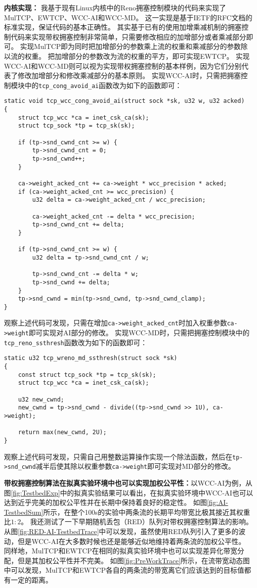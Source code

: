 \documentclass[winfonts]{njuthesis}
\begin{document}
\textbf{内核实现：}
我基于现有Linux内核中的Reno拥塞控制模块的代码来实现了MulTCP、EWTCP、WCC-AI和WCC-MD。
这一实现是基于IETF的RFC文档\cite{allman2009CC}的标准实现，保证代码的基本正确性。
其实基于已有的使用加增乘减机制的拥塞控制代码来实现带权拥塞控制非常简单，只需要修改相应的加增部分或者乘减部分即可。
实现MulTCP即为同时把加增部分的参数乘上流的权重和乘减部分的参数除以流的权重。
把加增部分的参数改为流的权重的平方，即可实现EWTCP。
实现WCC-AI和WCC-MD则可以视为实现带权拥塞控制的基本样例，因为它们分别代表了修改加增部分和修改乘减部分的基本原则。
实现WCC-AI时，只需把拥塞控制模块中的\texttt{tcp\_cong\_avoid\_ai}函数改为如下的函数即可：
\lstset{language=C,basicstyle=\footnotesize,frame=shadowbox}
\begin{lstlisting}
static void tcp_wcc_cong_avoid_ai(struct sock *sk, u32 w, u32 acked)
{
	struct tcp_wcc *ca = inet_csk_ca(sk);
	struct tcp_sock *tp = tcp_sk(sk);

	if (tp->snd_cwnd_cnt >= w) {
		tp->snd_cwnd_cnt = 0;
		tp->snd_cwnd++;
	}

	ca->weight_acked_cnt += ca->weight * wcc_precision * acked;
	if (ca->weight_acked_cnt >= wcc_precision) {
		u32 delta = ca->weight_acked_cnt / wcc_precision;

		ca->weight_acked_cnt -= delta * wcc_precision;
		tp->snd_cwnd_cnt += delta;
	}

	if (tp->snd_cwnd_cnt >= w) {
		u32 delta = tp->snd_cwnd_cnt / w;

		tp->snd_cwnd_cnt -= delta * w;
		tp->snd_cwnd += delta;
	}
	tp->snd_cwnd = min(tp->snd_cwnd, tp->snd_cwnd_clamp);
}
\end{lstlisting}
观察上述代码可发现，只需在增加\texttt{ca->weight\_acked\_cnt}时加入权重参数\texttt{ca->weight}即可实现对AI部分的修改。
实现WCC-MD时，只需把拥塞控制模块中的\texttt{tcp\_reno\_ssthresh}函数改为如下的函数即可：
\lstset{language=C,basicstyle=\footnotesize,frame=shadowbox}
\begin{lstlisting}
static u32 tcp_wreno_md_ssthresh(struct sock *sk)
{
    const struct tcp_sock *tp = tcp_sk(sk);
    struct tcp_wcc *ca = inet_csk_ca(sk);

    u32 new_cwnd;
    new_cwnd = tp->snd_cwnd - divide((tp->snd_cwnd >> 1U), ca->weight);

    return max(new_cwnd, 2U);
}
\end{lstlisting}
观察上述代码可发现，只需自己用整数运算操作实现一个除法函数，然后在\texttt{tp->snd\_cwnd}减半后使其除以权重参数\texttt{ca->weight}即可实现对MD部分的修改。

\textbf{带权拥塞控制算法在拟真实验环境中也可以实现加权公平性：}以WCC-AI为例，从图\ref{fig:TestbedExp}中的拟真实验结果可以看出，在拟真实验环境中WCC-AI也可以达到近乎完美的加权公平性并在长期中保持着良好的稳定性。
如图\ref{fig:AI-TestbedSum}所示，在整个100s的实验中两条流的长期平均带宽比极其接近其权重比$1:2$。
我还测试了一下早期随机丢包（RED）队列对带权拥塞控制算法的影响。
从图\ref{fig:RED-AI-TestbedTrace}中可以发现，虽然使用RED队列引入了更多的波动，但是WCC-AI在大多数时候也还是能够近似地维持着两条流的加权公平性。
同样地，MulTCP和EWTCP在相同的拟真实验环境中也可以实现差异化带宽分配，但是其加权公平性并不完美。
如图\ref{fig:PreWorkTrace}所示，在流带宽动态图中可以发现，MulTCP和EWTCP各自的两条流的带宽离它们应该达到的目标值都有一定的距离。
\end{document}
